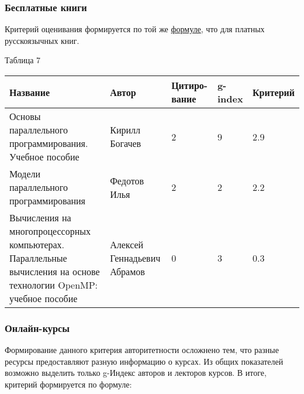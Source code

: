\documentclass{article}
\begin{document}
		\subsubsection{Бесплатные книги}
		Критерий оценивания формируется по той же \hyperlink{formula2}{формуле}, что для платных русскоязычных книг.			
			\begin{flushleft}
				Таблица 7
				\begin{longtable}{|p{6cm}|p{4cm}|p{1.8cm}|p{1.55cm}|p{2cm}|}
\hline
Название & Автор & Цитиро-вание & g-index & Критерий \\\hline

Основы параллельного программирования. Учебное пособие &
Кирилл Богачев & 2 & 9 & 2.9 \\\hline

Модели параллельного программирования &
Федотов Илья & 2 & 2 & 2.2 \\\hline

Вычисления на многопроцессорных компьютерах. Параллельные вычисления на основе технологии OpenMP: учебное пособие &
Алексей Геннадьевич Абрамов & 0 & 3 & 0.3 \\\hline

				\end{longtable}
			\end{flushleft}
\newpage
		\subsubsection{Онлайн-курсы}
		Формирование данного критерия авторитетности осложнено тем, что разные ресурсы предоставляют разную информацию о курсах. Из общих показателей возможно выделить только g-Индекс авторов и лекторов курсов. В итоге, критерий формируется по формуле:
		 
\end{document}
